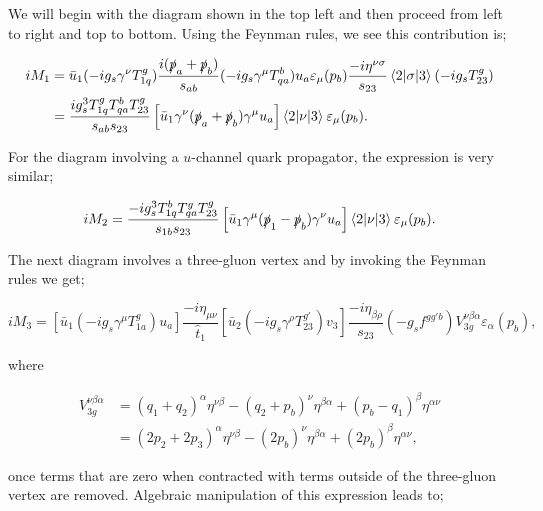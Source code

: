 We will begin with the diagram shown in the top left and then proceed from left to right and top to bottom. Using the Feynman rules, we see this contribution is;

\begin{equation}
\begin{split}
iM_1 &= \bar{u}_1(-ig_s\gamma^\nu T^g_{1q})\frac{i(\slashed{p}_a+\slashed{p}_b)}{s_{ab}}(-ig_s \gamma^\mu T_{qa}^b)u_a \varepsilon_\mu(p_b) \frac{-i \eta^{\nu \sigma}}{s_{23}} \mathinner{\langle2\vert\sigma\vert3\rangle}_{} (- i g_s T^g_{23}) \\
&= \frac{i g_s^3 T^g_{1q}T^b_{qa}T^g_{23}}{s_{ab}s_{23}} \left[ \bar{u}_1 \gamma^\nu (\slashed{p}_a + \slashed{p}_b) \gamma^\mu u_a \right] \mathinner{\langle2\vert\nu\vert3\rangle}_{} \varepsilon_\mu (p_b).
\end{split}
\end{equation}

For the diagram involving a $u$-channel quark propagator, the expression is very similar;

\begin{equation}
iM_2 = \frac{-i g_s^3 T^b_{1q}T^g_{qa}T^g_{23}}{s_{1b}s_{23}} \left[ \bar{u}_1 \gamma^\mu (\slashed{p}_1 - \slashed{p}_b) \gamma^\nu u_a \right] \mathinner{\langle2\vert\nu\vert3\rangle}_{} \varepsilon_\mu (p_b).
\end{equation}

The next diagram involves a three-gluon vertex and by invoking the Feynman rules we get;

\begin{equation}
iM_3 = \left[\bar{u}_1(-i g_s \gamma^\mu T^g_{1a}) u_a \right] \frac{-i \eta_{\mu \nu}}{\hat{t}_1} \left[\bar{u}_2 (-i g_s \gamma^\rho T^{g'}_{23}) v_3 \right] \frac{- i \eta_{\beta \rho}}{s_{23}} (-g_s f^{g g' b})V_{3g}^{\nu  \beta \alpha} \varepsilon_\alpha(p_b),
\end{equation}

where

\begin{equation}
\begin{split}
V_{3g}^{\nu \beta \alpha} &= (q_1+q_2)^\alpha \eta^{\nu \beta} - (q_2+p_b)^\nu \eta^{\beta \alpha} + (p_b-q_1)^\beta \eta^{ \alpha \nu} \\
&= (2p_2 + 2p_3)^\alpha \eta^{\nu \beta} - (2p_b)^\nu \eta^{\beta \alpha} + (2p_b)^\beta \eta^{ \alpha \nu},
\end{split}
\end{equation}

once terms that are zero when contracted with terms outside of the three-gluon vertex are removed. Algebraic manipulation of this expression leads to;


